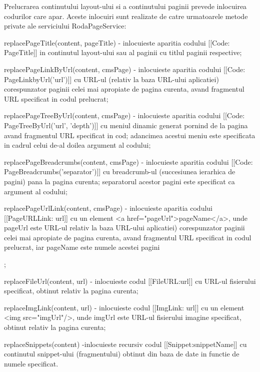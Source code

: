 Prelucrarea continutului layout-ului si a continutului paginii prevede inlocuirea codurilor care apar. Aceste inlocuiri sunt realizate de catre urmatoarele metode private ale serviciului RodaPageService:
\begin{itemize}
\item{replacePageTitle(content, pageTitle) - inlocuieste aparitia codului [[Code: PageTitle]] in continutul layout-ului sau al paginii cu titlul paginii respective;}
\item{replacePageLinkByUrl(content, cmsPage) - inlocuieste aparitia codului [[Code: PageLinkbyUrl('url')]] cu URL-ul (relativ la baza URL-ului aplicatiei) corespunzator paginii celei mai apropiate de pagina curenta, avand fragmentul URL specificat in codul prelucrat;} 
\item{replacePageTreeByUrl(content, cmsPage) - inlocuieste aparitia codului [[Code: PageTreeByUrl('url', 'depth')]] cu meniul dinamic generat pornind de la pagina avand fragmentul URL specificat in cod; adancimea acestui meniu este specificata in cadrul celui de-al doilea argument al codului;
\item{replacePageBreadcrumbs(content, cmsPage) - inlocuieste aparitia codului [[Code: PageBreadcrumbs('separator')]]} cu breadcrumb-ul (succesiunea ierarhica de pagini) pana la pagina curenta; separatorul acestor pagini este specificat ca argument al codului;
\item{replacePageUrlLink(content, cmsPage)}  - inlocuieste aparitia codului [[PageURLLink: url]] cu un element <a href="pageUrl">pageName</a>, unde pageUrl este URL-ul relativ la baza URL-ului aplicatiei) corespunzator paginii celei mai apropiate de pagina curenta, avand fragmentul URL specificat in codul prelucrat, iar pageName este numele acestei pagini};
\item{replaceFileUrl(content, url) - inlocuieste codul [[FileURL:url]] cu URL-ul fisierului specificat, obtinut relativ la pagina curenta;}
\item{replaceImgLink(content, url) - inlocuieste codul [[ImgLink: url]] cu un element <img src="imgUrl"/>, unde imgUrl este URL-ul fisierului imagine specificat, obtinut relativ la pagina curenta;}
\item{replaceSnippets(content) -inlocuieste recursiv codul [[Snippet:snippetName]] cu continutul snippet-ului (fragmentului) obtinut din baza de date in functie de numele specificat.}
\end{itemize}